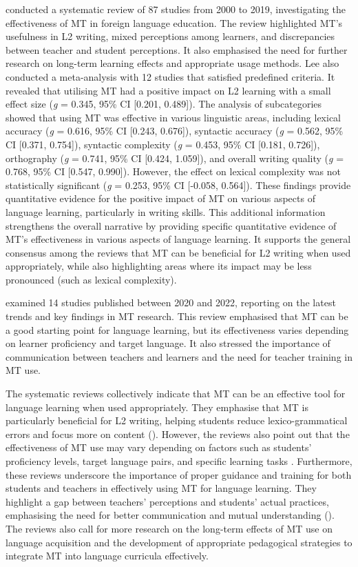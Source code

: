 \documentclass[output=paper]{langscibook}
\begin{document}
\citet{lee23} conducted a systematic review of 87 studies from 2000 to 2019, investigating the effectiveness of MT in foreign language education. The review highlighted MT’s usefulness in L2 writing, mixed perceptions among learners, and discrepancies between teacher and student perceptions. It also emphasised the need for further research on long-term learning effects and appropriate usage methods. Lee also conducted a meta-analysis with 12 studies that satisfied predefined criteria. It revealed that utilising MT had a positive impact on L2 learning with a small effect size (\textit{g} = 0.345, 95\% CI [0.201, 0.489]). The analysis of subcategories showed that using MT was effective in various linguistic areas, including lexical accuracy (\textit{g} = 0.616, 95\% CI [0.243, 0.676]), syntactic accuracy (\textit{g} = 0.562, 95\% CI [0.371, 0.754]), syntactic complexity (\textit{g} = 0.453, 95\% CI [0.181, 0.726]), orthography (\textit{g} = 0.741, 95\% CI [0.424, 1.059]), and overall writing quality (\textit{g} = 0.768, 95\% CI [0.547, 0.990]). However, the effect on lexical complexity was not statistically significant (\textit{g} = 0.253, 95\% CI [-0.058, 0.564]). These findings provide quantitative evidence for the positive impact of MT on various aspects of language learning, particularly in writing skills. This additional information strengthens the overall narrative by providing specific quantitative evidence of MT’s effectiveness in various aspects of language learning. It supports the general consensus among the reviews that MT can be beneficial for L2 writing when used appropriately, while also highlighting areas where its impact may be less pronounced (such as lexical complexity).

\citet{ohashi2024} examined 14 studies published between 2020 and 2022, reporting on the latest trends and key findings in MT research. This review emphasised that MT can be a good starting point for language learning, but its effectiveness varies depending on learner proficiency and target language. It also stressed the importance of communication between teachers and learners and the need for teacher training in MT use.

The systematic reviews collectively indicate that MT can be an effective tool for language learning when used appropriately. They emphasise that MT is particularly beneficial for L2 writing, helping students reduce lexico-grammatical errors and focus more on content (\citealt{klimova22, lee23}). However, the reviews also point out that the effectiveness of MT use may vary depending on factors such as students’ proficiency levels, target language pairs, and specific learning tasks \citep{ohashi2024}. Furthermore, these reviews underscore the importance of proper guidance and training for both students and teachers in effectively using MT for language learning. They highlight a gap between teachers’ perceptions and students’ actual practices, emphasising the need for better communication and mutual understanding (\citealt{jolley22, lee23}). The reviews also call for more research on the long-term effects of MT use on language acquisition and the development of appropriate pedagogical strategies to integrate MT into language curricula effectively.
\end{document}
